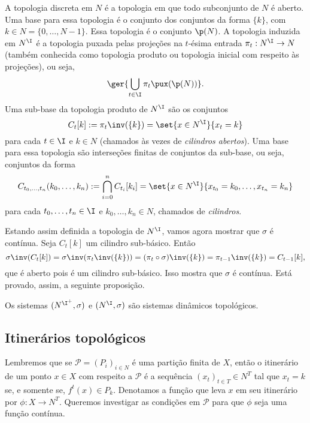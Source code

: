 A topologia discreta em $N$ é a topologia em que todo subconjunto de $N$ é aberto. Uma base para essa topologia é o conjunto dos conjuntos da forma $\{k\}$, com $k \in N=\{0,\ldots,N-1\}$. Essa topologia é o conjunto $\p(N)$. A topologia induzida em $N^\I$ é a topologia puxada pelas projeções na $t$-ésima entrada $\pi_t: N^\I \to N$ (também conhecida como topologia produto ou topologia inicial com respeito às projeções), ou seja,
	\begin{equation*}
	\ger{\bigcup_{t \in \I} {\pi_t}\pux(\p(N))}.
	\end{equation*}
Uma sub-base da topologia produto de $N^\I$ são os conjuntos
	\begin{equation*}
	C_t[k] := {\pi_t}\inv(\{k\}) = \set{x \in N^\I}{x_t=k}
	\end{equation*}
para cada $t \in \I$ e $k \in N$ (chamados às vezes de \emph{cilindros abertos}). Uma base para essa topologia são interseções finitas de conjuntos da sub-base, ou seja, conjuntos da forma
	\begin{equation*}
	C_{t_0,\ldots,t_n}(k_0,\ldots,k_n) := \bigcap_{i=0}^n C_{t_i}[k_i] = \set{x \in N^\I}{x_{t_0}=k_0,\ldots,x_{t_n}=k_n}
	\end{equation*}
para cada $t_0,\ldots,t_n \in \I$ e $k_0,\ldots,k_n \in N$, chamados de \emph{cilindros}.

Estando assim definida a topologia de $N^\I$, vamos agora mostrar que $\sigma$ é contínua. Seja $C_t[k]$ um cilindro sub-básico. Então
	\begin{equation*}
	\sigma\inv(C_t[k]) = \sigma\inv({\pi_t}\inv(\{k\})) = (\pi_t \circ \sigma)\inv(\{k\}) = {\pi_{t-1}}\inv(\{k\}) = C_{t-1}[k],
	\end{equation*}
que é aberto pois é um cilindro sub-básico. Isso mostra que $\sigma$ é contínua. Está provado, assim, a seguinte proposição.

\begin{proposition}
Os sistemas $(N^{\I^+},\sigma)$ e $(N^\I,\sigma)$ são sistemas dinâmicos topológicos.
\end{proposition}

\subsection{Itinerários topológicos}

Lembremos que se $\mathcal{P}=(P_i)_{i \in N}$ é uma partição finita de $X$, então o itinerário de um ponto $x \in X$ com respeito a $\mathcal{P}$ é a sequência $(x_t)_{t \in T} \in N^T$ tal que $x_t=k$ se, e somente se, $f^t(x) \in P_k$. Denotamos a função que leva $x$ em seu itinerário por $\phi: X \to N^T$. Queremos investigar as condições em $\mathcal{P}$ para que $\phi$ seja uma função contínua.


